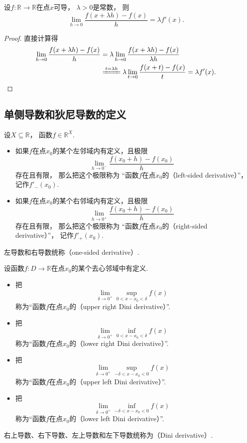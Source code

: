 \begin{proposition}
设\(f\colon\mathbb{R}\to\mathbb{R}\)在点\(x\)可导，
\(\lambda>0\)是常数，
则\[
	\lim_{h\to0} \frac{f(x+\lambda h)-f(x)}{h}
	= \lambda f'(x).
\]
\begin{proof}
直接计算得\begin{align*}
	\lim_{h\to0} \frac{f(x+\lambda h)-f(x)}{h}
	&= \lambda \lim_{h\to0} \frac{f(x+\lambda h)-f(x)}{\lambda h} \\
	&\xlongequal{t=\lambda h}
		\lambda \lim_{t\to0} \frac{f(x+t)-f(x)}{t}
	= \lambda f'(x).
	\qedhere
\end{align*}
\end{proof}
\end{proposition}

\subsection{单侧导数和狄尼导数的定义}
\begin{definition}
设\(X\subseteq\mathbb{R}\)，
函数\(f\in\mathbb{R}^X\).
\begin{itemize}
	\item 如果\(f\)在点\(x_0\)的某个左邻域内有定义，且极限\[
		\lim_{h\to0^-} \frac{f(x_0+h)-f(x_0)}{h}
	\]存在且有限，
	那么把这个极限称为
	“函数\(f\)在点\(x_0\)的（left-sided derivative）”，
	记作\(f'_-(x_0)\).
	\item 如果\(f\)在点\(x_0\)的某个右邻域内有定义，且极限\[
		\lim_{h\to0^+} \frac{f(x_0+h)-f(x_0)}{h}
	\]存在且有限，
	那么把这个极限称为
	“函数\(f\)在点\(x_0\)的（right-sided derivative）”，
	记作\(f'_+(x_0)\).
\end{itemize}
左导数和右导数统称（one-sided derivative）.
\end{definition}

\begin{definition}
设函数\(f\colon D\to\mathbb{R}\)在点\(x_0\)的某个去心邻域中有定义.
\begin{itemize}
	\item 把\[
		\lim_{\delta\to0^+} \sup_{0<x-x_0<\delta} f(x)
	\]称为“函数\(f\)在点\(x_0\)的（upper right Dini derivative）”.
	\item 把\[
		\lim_{\delta\to0^+} \inf_{0<x-x_0<\delta} f(x)
	\]称为“函数\(f\)在点\(x_0\)的（lower right Dini derivative）”.
	\item 把\[
		\lim_{\delta\to0^+} \sup_{-\delta<x-x_0<0} f(x)
	\]称为“函数\(f\)在点\(x_0\)的（upper left Dini derivative）”.
	\item 把\[
		\lim_{\delta\to0^+} \inf_{-\delta<x-x_0<0} f(x)
	\]称为“函数\(f\)在点\(x_0\)的（lower left Dini derivative）”.
\end{itemize}
右上导数、右下导数、左上导数和左下导数统称为（Dini derivative）.
\end{definition}

